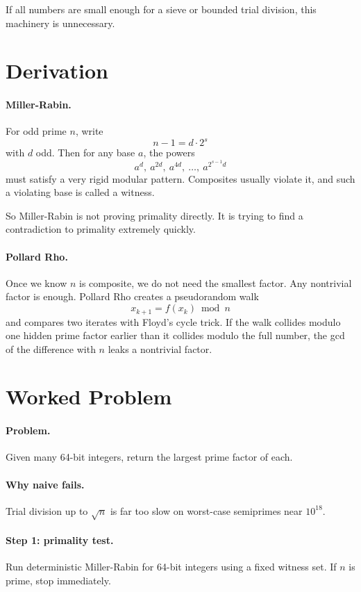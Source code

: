 If all numbers are small enough for a sieve or bounded trial division, this machinery is unnecessary.

\section*{Derivation}

\paragraph{Miller-Rabin.}
For odd prime \(n\), write
\[
n-1 = d \cdot 2^s
\]
with \(d\) odd. Then for any base \(a\), the powers
\[
a^d,\ a^{2d},\ a^{4d},\ \dots,\ a^{2^{s-1}d}
\]
must satisfy a very rigid modular pattern. Composites usually violate it, and such a violating base is called a
witness.

So Miller-Rabin is not proving primality directly. It is trying to find a contradiction to primality extremely quickly.

\paragraph{Pollard Rho.}
Once we know \(n\) is composite, we do not need the smallest factor. Any nontrivial factor is enough. Pollard Rho
creates a pseudorandom walk
\[
x_{k+1} = f(x_k) \bmod n
\]
and compares two iterates with Floyd's cycle trick. If the walk collides modulo one hidden prime factor earlier than it
collides modulo the full number, the gcd of the difference with \(n\) leaks a nontrivial factor.

\section*{Worked Problem}

\paragraph{Problem.}
Given many 64-bit integers, return the largest prime factor of each.

\paragraph{Why naive fails.}
Trial division up to \(\sqrt{n}\) is far too slow on worst-case semiprimes near \(10^{18}\).

\paragraph{Step 1: primality test.}
Run deterministic Miller-Rabin for 64-bit integers using a fixed witness set. If \(n\) is prime, stop immediately.

